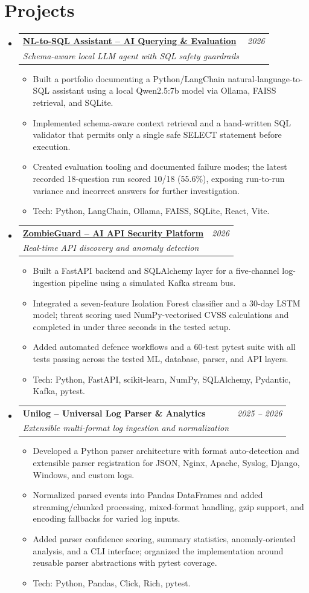 \documentclass[a4paper,10.5pt]{article}
\makeatletter
\newcommand{\resumeItemListStart}{
\begin{itemize}[leftmargin=3ex, itemsep=0pt, parsep=0pt, topsep=0pt]
\small
}
\newcommand{\resumeItemListEnd}{
\end{itemize}\vspace{1mm}
}
\newcommand{\resumeProject}[4]{
\item
\begin{tabular*}{0.98\textwidth}[t]{l@{\extracolsep{\fill}}r}
\textbf{#1} & \textit{\footnotesize #3} \\
\footnotesize\textit{#2} & \footnotesize #4
\end{tabular*}
\vspace{-2mm}
}
\makeatother
\begin{document}
\vspace{-2mm}

\section{Projects}
\begin{itemize}[leftmargin=*, itemsep=3pt, parsep=0pt, topsep=0pt]

\resumeProject
{\href{https://github.com/Asterioxer/nl-to-sql-portfolio-site}{NL-to-SQL Assistant -- AI Querying \& Evaluation}}
{Schema-aware local LLM agent with SQL safety guardrails}
{2026}
{}
\resumeItemListStart
\item Built a portfolio documenting a Python/LangChain natural-language-to-SQL assistant using a local Qwen2.5:7b model via Ollama, FAISS retrieval, and SQLite.
\item Implemented schema-aware context retrieval and a hand-written SQL validator that permits only a single safe SELECT statement before execution.
\item Created evaluation tooling and documented failure modes; the latest recorded 18-question run scored 10/18 (55.6\%), exposing run-to-run variance and incorrect answers for further investigation.
\item Tech: Python, LangChain, Ollama, FAISS, SQLite, React, Vite.
\resumeItemListEnd

\resumeProject
{\href{https://github.com/Asterioxer/ZombieGuard_Insiders}{ZombieGuard -- AI API Security Platform}}
{Real-time API discovery and anomaly detection}
{2026}
{}
\resumeItemListStart
\item Built a FastAPI backend and SQLAlchemy layer for a five-channel log-ingestion pipeline using a simulated Kafka stream bus.
\item Integrated a seven-feature Isolation Forest classifier and a 30-day LSTM model; threat scoring used NumPy-vectorised CVSS calculations and completed in under three seconds in the tested setup.
\item Added automated defence workflows and a 60-test pytest suite with all tests passing across the tested ML, database, parser, and API layers.
\item Tech: Python, FastAPI, scikit-learn, NumPy, SQLAlchemy, Pydantic, Kafka, pytest.
\resumeItemListEnd

\resumeProject
{Unilog -- Universal Log Parser \& Analytics}
{Extensible multi-format log ingestion and normalization}
{2025 -- 2026}
{}
\resumeItemListStart
\item Developed a Python parser architecture with format auto-detection and extensible parser registration for JSON, Nginx, Apache, Syslog, Django, Windows, and custom logs.
\item Normalized parsed events into Pandas DataFrames and added streaming/chunked processing, mixed-format handling, gzip support, and encoding fallbacks for varied log inputs.
\item Added parser confidence scoring, summary statistics, anomaly-oriented analysis, and a CLI interface; organized the implementation around reusable parser abstractions with pytest coverage.
\item Tech: Python, Pandas, Click, Rich, pytest.
\resumeItemListEnd


\end{itemize}
\end{document}
